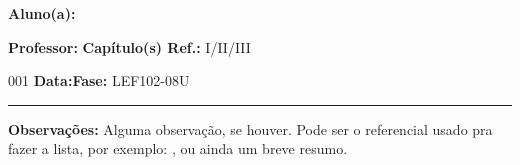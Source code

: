 \documentclass[
	12pt,				%
	openright,			%
	oneside,			%
	a4paper,			%
	english,			%
	brazil				%
]{abntex2}
\begin{document}
        
    \noindent \textbf{Aluno(a):} \imprimirautor
    \par\noindent \textbf{Professor:} \imprimirorientador\hfill{}\textbf{Capítulo(s) Ref.:} I/II/III  
    \par\noindent \textbf{\imprimirtipotrabalho} 001  \hfill{}\textbf{Data:}\imprimirdata\hfill{}\textbf{Fase:} LEF102-08U
    \rule{\textwidth}{.5pt}
    \bigskip{}
    \begin{center}
        \ABNTEXchapterfont\Large\MakeUppercase{\imprimirtitulo}
    \end{center}

    \noindent \textbf{Observações:} Alguma observação, se houver. Pode ser o referencial usado pra fazer a lista, por exemplo: \cite{GREINER:2004,SALINAS:2001}, ou ainda um breve resumo.
    \tableofcontents*
    \cleardoublepage
    \textual
    \pagestyle{cabecalholimpo}
    

    
\end{document}
